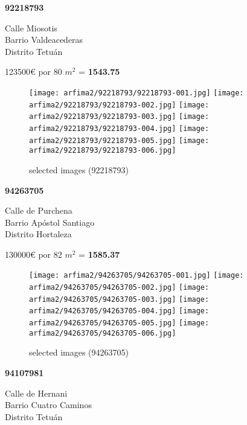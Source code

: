 \documentclass[10pt,a4paper]{report}
\begin{document}
\newpage
\begin{center}
\begin{large}
\textbf{92218793}\\[10px]
\end{large}
Calle Miosotis\\
Barrio Valdeacederas\\
Distrito Tetuán\\
\end{center}
{\large 123500€ por 80 $m^2$ = \color{blue} \textbf{1543.75}}
\begin{figure}[htbp]

\texttt{[image: arfima2/92218793/92218793-001.jpg]}
\texttt{[image: arfima2/92218793/92218793-002.jpg]}
\texttt{[image: arfima2/92218793/92218793-003.jpg]}
\texttt{[image: arfima2/92218793/92218793-004.jpg]}
\texttt{[image: arfima2/92218793/92218793-005.jpg]}
\texttt{[image: arfima2/92218793/92218793-006.jpg]}
\caption{selected images (92218793)}
\end{figure}
\newpage
\begin{center}
\begin{large}
\textbf{94263705}\\[10px]
\end{large}
Calle de Purchena\\
Barrio Apóstol Santiago\\
Distrito Hortaleza\\
\end{center}
{\large 130000€ por 82 $m^2$ = \color{blue} \textbf{1585.37}}
\begin{figure}[htbp]

\texttt{[image: arfima2/94263705/94263705-001.jpg]}
\texttt{[image: arfima2/94263705/94263705-002.jpg]}
\texttt{[image: arfima2/94263705/94263705-003.jpg]}
\texttt{[image: arfima2/94263705/94263705-004.jpg]}
\texttt{[image: arfima2/94263705/94263705-005.jpg]}
\texttt{[image: arfima2/94263705/94263705-006.jpg]}
\caption{selected images (94263705)}
\end{figure}
\newpage
\begin{center}
\begin{large}
\textbf{94107981}\\[10px]
\end{large}
Calle de Hernani\\
Barrio Cuatro Caminos\\
Distrito Tetuán\\
\end{center}
\end{document}
